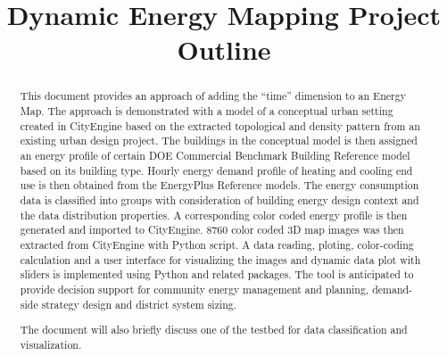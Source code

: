 \documentclass[12pt]{article}
\begin{document}
\title{Dynamic Energy Mapping Project Outline}
\maketitle
\begin{abstract}
  This document provides an approach of adding the ``time'' dimension
  to an Energy Map. The approach is demonstrated with a model of a
  conceptual urban setting created in CityEngine based on the
  extracted topological and density pattern from an existing urban
  design project. The buildings in the conceptual model is then
  assigned an energy profile of certain DOE Commercial Benchmark
  Building Reference model based on its building type. Hourly energy
  demand profile of heating and cooling end use is then obtained from
  the EnergyPlus Reference models. The energy consumption data is
  classified into groups with consideration of building energy design
  context and the data distribution properties. A corresponding color
  coded energy profile is then generated and imported to
  CityEngine. 8760 color coded 3D map images was then extracted from
  CityEngine with Python script. A data reading, ploting,
  color-coding calculation and a user interface for visualizing the
  images and dynamic data plot with sliders is implemented using
  Python and related packages. The tool is anticipated to provide
  decision support for community energy management and
  planning, demand-side strategy design and district system sizing.
  
  The document will also briefly discuss one of the testbed for data
  classification and visualization.
\end{abstract}
\newpage
\end{document}
